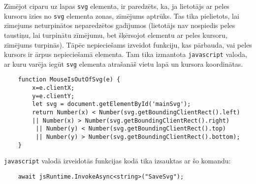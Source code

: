 \par Zīmējot ciparu uz lapas \texttt{svg} elementa, ir paredzēts, ka, ja lietotājs ar peles kursoru izies no \texttt{svg} elementa zonas, zīmējums aptrūks. Tas tika pielietots, lai zīmejums neturpinātos neparedzētos gadījumos (lietotājs nav nospiedis peles taustiņu, lai turpinātu zīmējumu, bet šķērsojot elementu ar peles kursoru, zīmējums turpinās). Tāpēc nepieciešams izveidot funkciju, kas pārbauda, vai peles kursors ir ārpus nepieciešamā elementa. Tam tika izmantota \texttt{javascript} valoda, ar kuru varēja iegūt \texttt{svg} elementa atrašanāš vietu lapā un kursora koordinātas.
{
\begin{verbatim}
    function MouseIsOutOfSvg(e) {
        x=e.clientX;
        y=e.clientY;
        let svg = document.getElementById('mainSvg');
        return Number(x) < Number(svg.getBoundingClientRect().left)
        || Number(x) > Number(svg.getBoundingClientRect().right)
         || Number(y) < Number(svg.getBoundingClientRect().top)
         || Number(y) > Number(svg.getBoundingClientRect().bottom);
    }
\end{verbatim}
}

\par \texttt{javascript} valodā izveidotās funkcijas kodā tika izsauktas ar šo komandu:

{
\begin{verbatim}
    await jsRuntime.InvokeAsync<string>("SaveSvg");
\end{verbatim}
}

